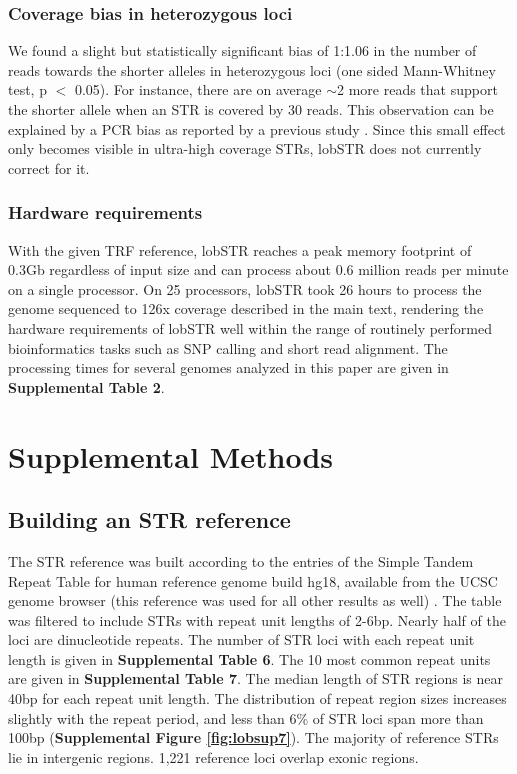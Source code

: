 {\subsubsection{Coverage bias in heterozygous loci}
We found a slight but statistically significant bias of 1:1.06 in the number of reads towards the shorter alleles in heterozygous loci (one sided Mann-Whitney test, p $<$ 0.05). For instance, there are on average $\sim$2 more reads that support the shorter allele when an STR is covered by 30 reads.  This observation can be explained by a PCR bias as reported by a previous study \cite{WattierEngelSaumitou-LapradeEtAl1998}. Since this small effect only becomes visible in ultra-high coverage STRs, lobSTR does not currently correct for it.

\subsubsection{Hardware requirements}
With the given TRF reference, lobSTR reaches a peak memory footprint of 0.3Gb regardless of input size and can process about 0.6 million reads per minute on a single processor. On 25 processors, lobSTR took 26 hours to process the genome sequenced to 126x coverage described in the main text, rendering the hardware requirements of lobSTR well within the range of routinely performed bioinformatics tasks such as SNP calling and short read alignment. The processing times for several genomes analyzed in this paper are given in \textbf{Supplemental Table 2}. 

\section{Supplemental Methods}
\subsection{Building an STR reference}
The STR reference was built according to the entries of the Simple Tandem Repeat Table for human reference genome build hg18, available from the UCSC genome browser (this reference was used for all other results as well) \cite{Kent2002}. The table was filtered to include STRs with repeat unit lengths of 2-6bp. Nearly half of the loci are dinucleotide repeats. The number of STR loci with each repeat unit length is given in \textbf{Supplemental Table 6}. The 10 most common repeat units are given in \textbf{Supplemental Table 7}. The median length of STR regions is near 40bp for each repeat unit length. The distribution of repeat region sizes increases slightly with the repeat period, and less than 6\% of STR loci span more than 100bp (\textbf{Supplemental Figure \ref{fig:lobsup7}}). The majority of reference STRs lie in intergenic regions. 1,221 reference loci overlap exonic regions.

}

